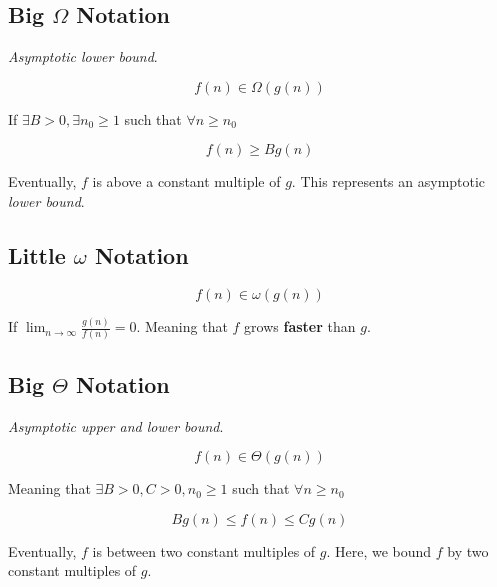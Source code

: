 \documentclass[12pt]{article}
\begin{document}



  \subsection{Big $\Omega$ Notation}
  {\it Asymptotic lower bound}.

  \[
    f(n) \in \Omega(g(n))
  \]

  If $\exists B > 0, \exists n_0 \ge 1$ such that $\forall n \ge n_0$

  \[
    f(n) \ge Bg(n)
  \]

  Eventually, $f$ is above a constant multiple of $g$. This represents an
  asymptotic {\it lower bound}.





  \subsection{Little $\omega$ Notation}

  \[
    f(n) \in \omega(g(n))
  \]

  If $\lim_{n \to \infty} \frac{g(n)}{f(n)} = 0$. Meaning that $f$ grows
  {\bf faster} than $g$.









  \subsection{Big $\Theta$ Notation}
  {\it Asymptotic upper and lower bound}.

  \[
    f(n) \in \Theta(g(n))
  \]

  Meaning that $\exists B > 0, C > 0, n_0 \ge 1$ such that $\forall n \ge n_0$

  \[
    Bg(n) \le f(n) \le Cg(n)
  \]

  Eventually, $f$ is between two constant multiples of $g$. Here, we bound $f$ by
  two constant multiples of $g$.


\end{document}
